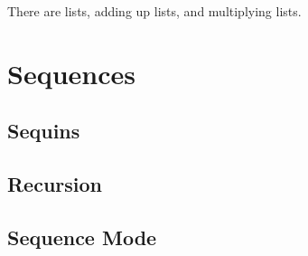 

There are lists, adding up lists, and multiplying lists.

\newpage
\chapterminitoc

\newpage
\section{Sequences}
\subsection{Sequins}
\noindent{}
\subsection{Recursion}
\subsection{Sequence Mode}
